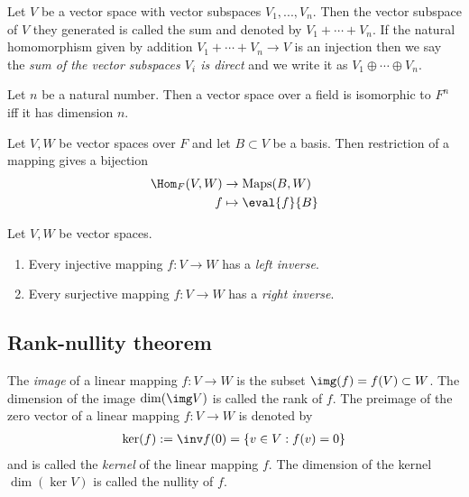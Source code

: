 \documentclass{article}
\begin{document}
\begin{definition}
	Let $V$ be a vector space with vector subspaces $V_1,...,V_n$. Then the vector
	subspace of $V$ they generated is called the sum and denoted by $V_1+\cdots+V_n$.
	If the natural homomorphism given by addition $V_1+\cdots +V_n\to V$ is an
	injection then we say the \emph{sum of the vector subspaces $V_i$ is direct} and
	we write it as $V_1\oplus\cdots\oplus V_n$.
\end{definition}

\begin{theorem}[Notes 1.7.7]
	Let $n$ be a natural number. Then a vector space over a field is isomorphic
	to $F^n$ iff it has dimension $n$.
\end{theorem}

\begin{lemma}[Notes 1.7.8]
	Let $V,W$ be vector spaces over $F$ and let $B\subset V$ be a basis. Then
	restriction of a mapping gives a bijection
	\begin{align*}
		\Hom_F(V,W) & \to \text{Maps}(B,W) \\
		f           & \mapsto \eval{f}{B}
	\end{align*}
\end{lemma}

\begin{proposition}[Notes 1.7.9]
	Let $V,W$ be vector spaces.
	\begin{enumerate}
		\item Every injective mapping $f:V\to W$ has a \emph{left inverse}.
		\item Every surjective mapping $f:V\to W$ has a \emph{right inverse}.
	\end{enumerate}
\end{proposition}

\subsection{Rank-nullity theorem}

\begin{definition}
	The \emph{image} of a linear mapping $f:V\to W$ is the subset $\img(f)=f(V)\subset W$.
	The dimension of the image $\dim(\img V)$ is called the rank of $f$.
	The preimage of the zero vector of a linear mapping $f:V\to W$ is denoted by
	\begin{align*}
		\ker(f):=\inv f(0)=\{v\in V : f(v)=0\}
	\end{align*}
	and is called the \emph{kernel} of the linear mapping $f$. The dimension of the
	kernel $\dim(\ker V)$ is called the nullity of $f$.
\end{definition}
\end{document}
